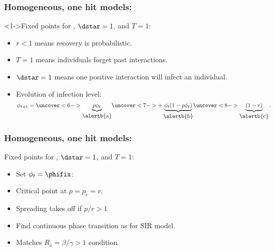 \begin{frame}
  \frametitle{Homogeneous, one hit models:}

  \begin{block}<1->{Fixed points for , $\dstar=1$, and $T=1$:}
    \begin{itemize}
    \item<2->
      \alert{$r<1$} means recovery is probabilistic.
    \item<3->
      \alert{$T=1$} means individuals forget past interactions.
    \item<4->
      \alert{$\dstar=1$} means one positive interaction 
      will infect an individual.
    \item<5-> 
      Evolution of infection level:
      $$
      \phi_{t+1} = 
      \uncover<6->{
        \underbrace{p \phi_{t}}_{\mbox{\alertb{a}}}
      }
      \uncover<7->{
        + 
        \underbrace{\phi_t(1 - p\phi_t)}_{\mbox{\alertb{b}}}
      }
      \uncover<8->{
        \underbrace{(1-r)}_{\mbox{\alertb{c}}}.
      }
      $$
      \begin{enumerate}
      \end{enumerate}
    \end{itemize}
  \end{block}

\end{frame}

\begin{frame}
  \frametitle{Homogeneous, one hit models:}

  \begin{block}{Fixed points for , $\dstar=1$, and $T=1$:}
    \begin{itemize}
    \item<1-> 
      Set $\phi_t = \phifix$:
    \item<5-> 
      Critical point at $p = p_c = r$.
    \item<6-> 
      Spreading takes off if $p/r > 1$
    \item<7->
      Find continuous phase transition as for SIR model.
    \item<8->
       Matches $R_o = \beta/\gamma > 1$ condition.
    \end{itemize}
  \end{block}

\end{frame}

